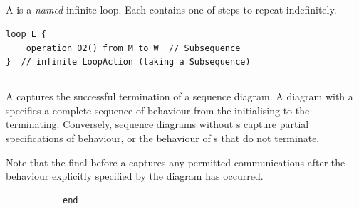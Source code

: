 \subsection{\mloopaction}

A \mloopaction{} is a \emph{named} infinite loop.    Each \mloopaction{} contains one
\msubsequence{} of steps to repeat indefinitely.

\begin{lstlisting}[style=Example]
loop L {
    operation O2() from M to W  // Subsequence
}  // infinite LoopAction (taking a Subsequence)
\end{lstlisting}

\subsection{\mfinalaction}

A \mfinalaction{} captures the successful termination of a sequence diagram.
A diagram with a \mfinalaction{} specifies a complete sequence of behaviour
from the \mtarget{} initialising to the \mtarget{} terminating.  Conversely,
sequence diagrams without \mfinalaction s capture partial specifications of
behaviour, or the behaviour of \mtarget s that do not terminate.

Note that the final \msequencegap{} before a \mfinalaction{} captures
any permitted communications after the behaviour explicitly specified by the
diagram has occurred.

\begin{figure}[h]

\begin{subfigure}[t]{0.38\textwidth}
\begin{lstlisting}[style=Example]
end
\end{lstlisting}
\end{subfigure}
\hfill
\begin{subfigure}[t]{0.58\textwidth}
\gsecaption
\centering
{}
\end{subfigure}

\end{figure}
